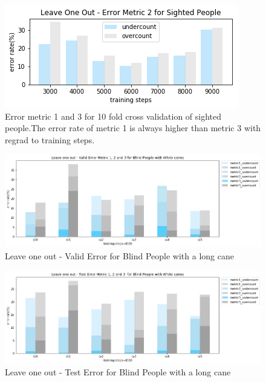 \documentclass[11pt]{article}
\begin{document}
{\begin{figure}[ht]
\centering
\includegraphics[scale=0.55]{error_metric_2_na_step}
\caption{Error metric 1 and 3 for 10 fold cross validation of sighted people.The error rate of metric 1 is always higher than metric 3 with regrad to training steps.}
\label{fig:error_metric_2_na_step}
\end{figure}


\begin{figure}[ht]
\centering
\includegraphics[scale=0.5]{error_metric_wc_10fold_valid4000}
\caption{Leave one out - Valid Error for Blind People with a long cane}
\label{fig:error_metric_wc_10fold_valid4000}
\end{figure}


\begin{figure}[ht]
\centering
\includegraphics[scale=0.5]{error_metric_wc_10fold_test4000}
\caption{Leave one out - Test Error for Blind People with a long cane}
\label{fig:error_metric_wc_10fold_test4000}
\end{figure}

}
\end{document}
